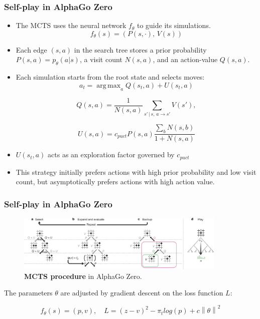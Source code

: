\documentclass[9pt]{beamer}
\DeclareMathOperator*{\argmax}{arg\,max}
\newcommand{\norm}[1]{\left\lVert#1\right\rVert}
\begin{document}
\begin{frame}
	\frametitle{Self-play in AlphaGo Zero}
	\begin{itemize}
		\item The MCTS uses the neural network $f_\theta$ to guide its simulations.
		$$f_\theta(s) = (P(s, \cdot), \, V(s))$$
		\item Each edge $(s, a)$ in the search tree stores a prior probability $P(s, a) = p_\theta(a | s)$, a visit count $N(s, a)$, and an action-value $Q(s, a)$.
	
	\item Each simulation starts from the root state and selects moves:
	\begin{equation}
		a_t  = \argmax_a{Q(s_t,a) + U(s_t,a)}
	\end{equation}

	\begin{equation}
		Q(s, a) = \frac{1}{N(s,a)} \sum_{s'\, | \, s,\, a \rightarrow s'}{V(s')},
	\end{equation}

	\begin{equation}
		U(s, a) = c_{puct}P(s, a)\frac{\sum_b N(s,b)}{1+N(s,a)}
	\end{equation}

	\item $U(s_t,a)$ acts as an exploration factor governed by $c_{puct}$
	\item This strategy initially prefers actions with high prior probability and low visit count, but asymptotically prefers actions with high action value.
	\end{itemize}
\end{frame}


\begin{frame}
	\frametitle{Self-play in AlphaGo Zero}
	
	\begin{figure}[H]
		\centering
		\includegraphics[width=10cm]{alpha-zero-mcts.png}
		\caption{\textbf{MCTS procedure} in AlphaGo Zero.\cite{Silver_2016}}
		\label{fig:alpha-zero-mcts}
	\end{figure}
	
	The parameters $\theta$ are adjusted by gradient descent on the loss function $L$:

	\begin{equation}
		f_\theta(s) = (p,v),\quad L = (z-v)^2 - \pi_t log(p) + c \norm{\theta}^2
	\end{equation}

\end{frame}
\end{document}
